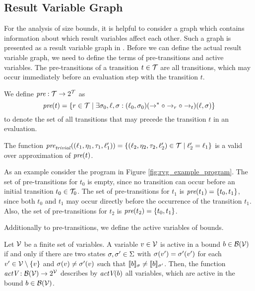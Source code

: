\subsection{Result Variable Graph}

For the analysis of size bounds, it is helpful to consider a graph which contains information about which result variables affect each other.
Such a graph is presented as a result variable graph in \cite{koat}.
Before we can define the actual result variable graph, we need to define the terms of pre-transitions and active variables.
The pre-transitions of a transition $t \in \mathcal{T}$ are all transitions, which may occur immediately before an evaluation step with the transition $t$.

\begin{definition} 
  We define $\emph{pre}: \mathcal{T} \rightarrow 2^{\mathcal{T}}$ as
  \[\emph{pre}(t) = \lbrace r \in \mathcal{T} \mid \exists \sigma_0, \ell, \sigma: (\ell_0, \sigma_0) (\rightarrow^* \circ \rightarrow_r \circ \rightarrow_{t}) (\ell, \sigma) \rbrace\]
  to denote the set of all transitions that may precede the transition $t$ in an evaluation.	
\end{definition}

The function $\emph{pre}_{\mathit{trivial}}((\ell_1, \eta_1, \tau_1, \ell_1')) = \lbrace (\ell_2, \eta_2, \tau_2, \ell_2') \in \mathcal{T} \mid \ell_2' = \ell_1 \rbrace$ is a valid over approximation of $\emph{pre}(t)$.



As an example consider the program in Figure \ref{fig:rvg_example_program}.
The set of pre-transitions for $t_0$ is empty, since no transition can occur before an initial transition $t_0 \in \mathcal{T}_0$.
The set of pre-transitions for $t_1$ is $\emph{pre}(t_1) = \lbrace t_0, t_1 \rbrace$, since both $t_0$ and $t_1$ may occur directly before the occurrence of the transition $t_1$.
Also, the set of pre-transitions for $t_2$ is $\emph{pre}(t_2) = \lbrace t_0, t_1 \rbrace$.

Additionally to pre-transitions, we define the active variables of bounds. 

\begin{definition}
  Let $\mathcal{V}$ be a finite set of variables.  
  A variable $v \in \mathcal{V}$ is active in a bound $b \in \mathcal{B}(\mathcal{V})$ if and only if there are two states $\sigma, \sigma' \in \Sigma$ with $\sigma(v') = \sigma'(v')$ for each $v' \in \mathcal{V} \setminus \lbrace v \rbrace$ and $\sigma(v) \neq \sigma'(v)$ such that $\llbracket b \rrbracket_{\sigma} \neq \llbracket b \rrbracket_{\sigma'}$.
  Then, the function $\emph{actV}: \mathcal{B}(\mathcal{V}) \rightarrow 2^{\mathcal{V}}$ describes by $\emph{actV}(b)$ all variables, which are active in the bound $b \in \mathcal{B}(\mathcal{V})$.
\end{definition}

